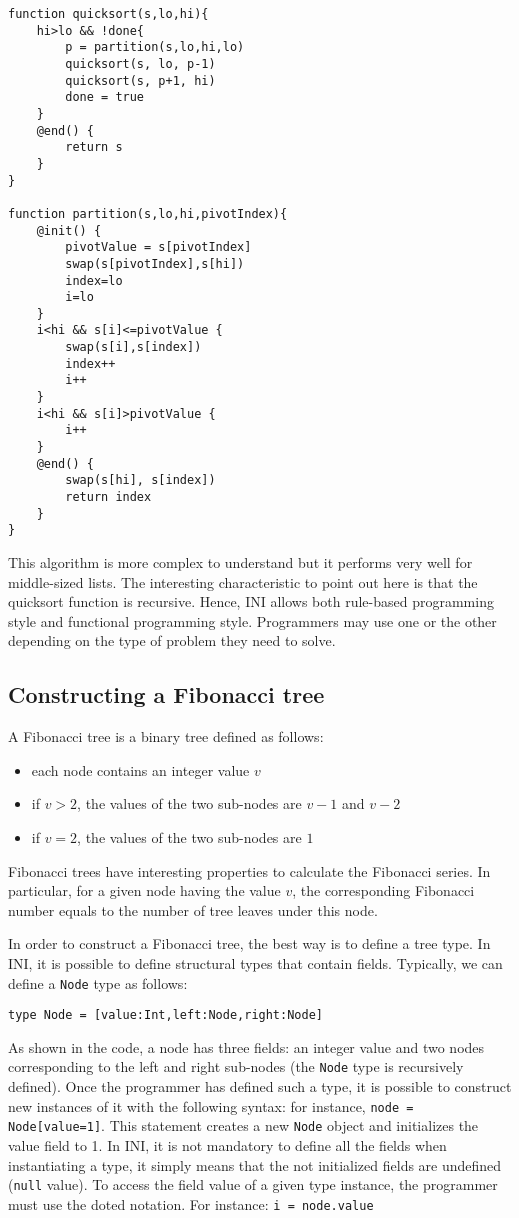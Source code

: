 \documentclass[11pt]{article}
\begin{document}
\begin{lstlisting}
function quicksort(s,lo,hi){
	hi>lo && !done{
		p = partition(s,lo,hi,lo)
		quicksort(s, lo, p-1)
		quicksort(s, p+1, hi)
		done = true
	}
	@end() {
		return s
	}
}

function partition(s,lo,hi,pivotIndex){
	@init() {
		pivotValue = s[pivotIndex]
		swap(s[pivotIndex],s[hi])
		index=lo
		i=lo
	}
	i<hi && s[i]<=pivotValue {
		swap(s[i],s[index])
		index++
		i++
	}
	i<hi && s[i]>pivotValue {
		i++
	}
	@end() {
		swap(s[hi], s[index])
		return index
	}
}
\end{lstlisting}

This algorithm is more complex to understand but it performs very well for middle-sized lists. The interesting characteristic to point out here is that the quicksort function is recursive. Hence, INI allows both rule-based programming style and functional programming style. Programmers may use one or the other depending on the type of problem they need to solve.

\subsection{Constructing a Fibonacci tree}

A Fibonacci tree is a binary tree defined as follows:

\begin{itemize}
\item each node contains an integer value $v$
\item if $v>2$, the values of the two sub-nodes are $v-1$ and $v-2$
\item if $v=2$, the values of the two sub-nodes are $1$
\end{itemize}

Fibonacci trees have interesting properties to calculate the Fibonacci series. In particular, for a given node having the value $v$, the corresponding Fibonacci number equals to the number of tree leaves under this node.

In order to construct a Fibonacci tree, the best way is to define a tree type. In INI, it is possible to define structural types that contain fields. Typically, we can define a \texttt{Node} type as follows:

\begin{lstlisting}[numbers=none]
type Node = [value:Int,left:Node,right:Node]
\end{lstlisting}

As shown in the code, a node has three fields: an integer value and two nodes corresponding to the left and right sub-nodes (the \texttt{Node} type is recursively defined). Once the programmer has defined such a type, it is possible to construct new instances of it with the following syntax: for instance, \texttt{node = Node[value=1]}. This statement creates a new \texttt{Node} object and initializes the value field to 1. In INI, it is not mandatory to define all the fields when instantiating a type, it simply means that the not initialized fields are undefined (\texttt{null} value). To access the field value of a given type instance, the programmer must use the doted notation. For instance: \texttt{i = node.value}
\end{document}
